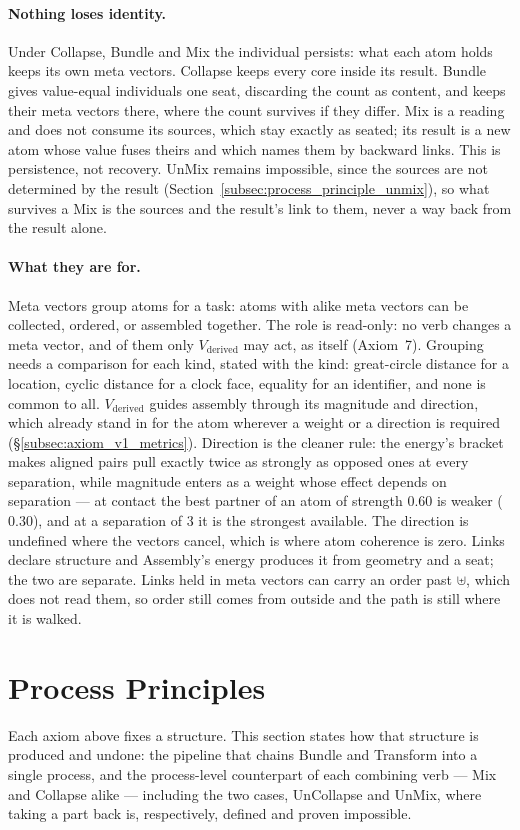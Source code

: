 \documentclass[12pt, a4paper]{article}
\begin{document}
\paragraph{Nothing loses identity.} Under Collapse, Bundle and Mix the
individual persists: what each atom holds keeps its own meta vectors.
Collapse keeps every core inside its result. Bundle gives value-equal
individuals one seat, discarding the count as content, and keeps their
meta vectors there, where the count survives if they differ. Mix is a
reading and does not consume its sources, which stay exactly as seated;
its result is a new atom whose value fuses theirs and which names them by
backward links. This is persistence, not recovery. UnMix remains
impossible, since the sources are not determined by the result
(Section~\ref{subsec:process_principle_unmix}), so what survives a Mix is
the sources and the result's link to them, never a way back from the
result alone.

\paragraph{What they are for.} Meta vectors group atoms for a task: atoms
with alike meta vectors can be collected, ordered, or assembled
together. The role is read-only: no verb changes a meta vector, and of them only
$V_{\text{derived}}$ may act, as itself (Axiom~7). Grouping needs a comparison for each kind, stated with the kind:
great-circle distance for a location, cyclic distance for a clock face,
equality for an identifier, and none is common to all.
$V_{\text{derived}}$ guides assembly through its magnitude and
direction, which already stand in for the atom wherever a weight or a
direction is required (\S\ref{subsec:axiom_v1_metrics}). Direction is
the cleaner rule: the energy's bracket makes aligned pairs pull exactly
twice as strongly as opposed ones at every separation, while magnitude
enters as a weight whose effect depends on separation --- at contact the
best partner of an atom of strength $0.60$ is weaker ($0.30$), and at a
separation of $3$ it is the strongest available. The direction is
undefined where the vectors cancel, which is where atom coherence is
zero. Links declare structure and Assembly's energy produces it from
geometry and a seat; the two are separate. Links held in meta vectors
can carry an order past $\uplus$, which does not read them, so order
still comes from outside and the path is still where it is walked.

\section{Process Principles}
\label{sec:process_principles}
Each axiom above fixes a structure. This section states how that
structure is produced and undone: the pipeline that chains Bundle
and Transform into a single process, and the process-level
counterpart of each combining verb --- Mix and Collapse alike ---
including the two cases, UnCollapse and UnMix, where taking a part back is, respectively, defined and proven impossible.
\end{document}
